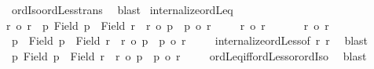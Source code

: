 \begin{isabellebody}
\ ordIso{\isacharunderscore}{\kern0pt}ordLess{\isacharunderscore}{\kern0pt}trans\ \isamarkupfalse%
\ blast\isanewline
{}\isamarkupfalse%
%
\endisatagproof
{\isafoldproof}%
%
\isadelimproof
\isanewline
%
\endisadelimproof
\isanewline
{}\isamarkupfalse%
\ internalize{\isacharunderscore}{\kern0pt}ordLeq{\isacharcolon}{\kern0pt}\isanewline
{\isachardoublequoteopen}{\isacharparenleft}{\kern0pt}r{\isacharprime}{\kern0pt}\ {\isasymle}o\ r{\isacharparenright}{\kern0pt}\ {\isacharequal}{\kern0pt}\ {\isacharparenleft}{\kern0pt}{\isasymexists}p{\isachardot}{\kern0pt}\ Field\ p\ {\isasymle}\ Field\ r\ {\isasymand}\ r{\isacharprime}{\kern0pt}\ {\isacharequal}{\kern0pt}o\ p\ {\isasymand}\ p\ {\isasymle}o\ r{\isacharparenright}{\kern0pt}{\isachardoublequoteclose}\isanewline
%
\isadelimproof
%
\endisadelimproof
%
\isatagproof
{}\isamarkupfalse%
\isanewline
\ \ \isamarkupfalse%
\ {\isacharasterisk}{\kern0pt}{\isacharcolon}{\kern0pt}\ {\isachardoublequoteopen}r{\isacharprime}{\kern0pt}\ {\isasymle}o\ r{\isachardoublequoteclose}\isanewline
\ \ \isamarkupfalse%
\isanewline
\ \ \isacommand{{\isacharbraceleft}{\kern0pt}}\isamarkupfalse%
\isamarkupfalse%
\ {\isachardoublequoteopen}r{\isacharprime}{\kern0pt}\ {\isacharless}{\kern0pt}o\ r{\isachardoublequoteclose}\isanewline
\ \ \ \isamarkupfalse%
\ \isamarkupfalse%
\ p\ \ {\isachardoublequoteopen}Field\ p\ {\isacharless}{\kern0pt}\ Field\ r\ {\isasymand}\ r{\isacharprime}{\kern0pt}\ {\isacharequal}{\kern0pt}o\ p\ {\isasymand}\ p\ {\isacharless}{\kern0pt}o\ r{\isachardoublequoteclose}\isanewline
\ \ \ \isamarkupfalse%
\ internalize{\isacharunderscore}{\kern0pt}ordLess{\isacharbrackleft}{\kern0pt}of\ r{\isacharprime}{\kern0pt}\ r{\isacharbrackright}{\kern0pt}\ \isamarkupfalse%
\ blast\isanewline
\ \ \ \isamarkupfalse%
\ {\isachardoublequoteopen}{\isasymexists}p{\isachardot}{\kern0pt}\ Field\ p\ {\isasymle}\ Field\ r\ {\isasymand}\ r{\isacharprime}{\kern0pt}\ {\isacharequal}{\kern0pt}o\ p\ {\isasymand}\ p\ {\isasymle}o\ r{\isachardoublequoteclose}\isanewline
\ \ \ \isamarkupfalse%
\ ordLeq{\isacharunderscore}{\kern0pt}iff{\isacharunderscore}{\kern0pt}ordLess{\isacharunderscore}{\kern0pt}or{\isacharunderscore}{\kern0pt}ordIso\ \isamarkupfalse%
\ blast\isanewline
\ \ \isacommand{{\isacharbraceright}{\kern0pt}}\isamarkupfalse%
\isanewline
\ \ \isamarkupfalse%

\end{isabellebody}
